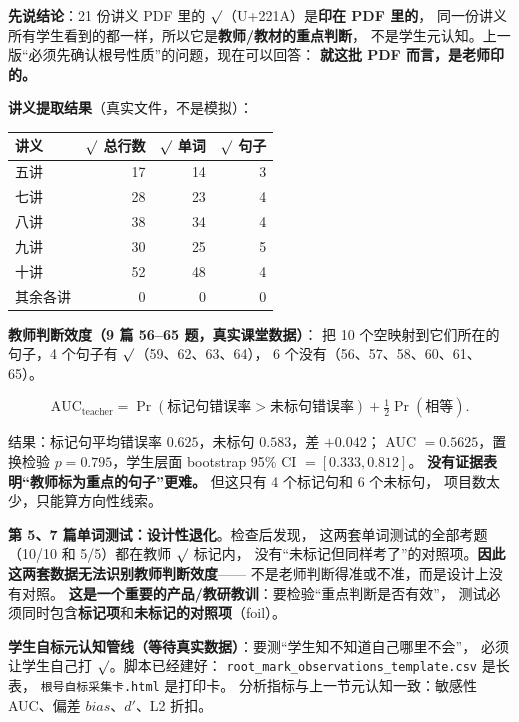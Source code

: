 \documentclass[UTF8,a4paper,11pt]{ctexart}
\begin{document}
\textbf{先说结论}：21 份讲义 PDF 里的 $\surd$（U+221A）是\textbf{印在 PDF 里的}，
同一份讲义所有学生看到的都一样，所以它是\textbf{教师/教材的重点判断}，
不是学生元认知。上一版“必须先确认根号性质”的问题，现在可以回答：
\textbf{就这批 PDF 而言，是老师印的。}

\textbf{讲义提取结果}（真实文件，不是模拟）：

\begin{center}
\begin{longtable}{@{}lrrr@{}}
\toprule
\textbf{讲义} & \textbf{$\surd$ 总行数} & \textbf{$\surd$ 单词} & \textbf{$\surd$ 句子} \\
\midrule
五讲 & 17 & 14 & 3 \\
七讲 & 28 & 23 & 4 \\
八讲 & 38 & 34 & 4 \\
九讲 & 30 & 25 & 5 \\
十讲 & 52 & 48 & 4 \\
其余各讲 & 0 & 0 & 0 \\
\bottomrule
\end{longtable}
\end{center}

\textbf{教师判断效度（9 篇 56--65 题，真实课堂数据）}：
把 10 个空映射到它们所在的句子，4 个句子有 $\surd$（59、62、63、64），
6 个没有（56、57、58、60、61、65）。

\begin{equation}
\text{AUC}_{\text{teacher}}=\Pr(\text{标记句错误率}>\text{未标句错误率})+\tfrac12\Pr(\text{相等}).
\end{equation}

结果：标记句平均错误率 $0.625$，未标句 $0.583$，差 $+0.042$；
AUC $=0.5625$，置换检验 $p=0.795$，学生层面 bootstrap 95\% CI $=[0.333,0.812]$。
\textbf{没有证据表明“教师标为重点的句子”更难。} 但这只有 4 个标记句和 6 个未标句，
项目数太少，只能算方向性线索。

\textbf{第 5、7 篇单词测试：设计性退化}。检查后发现，
这两套单词测试的全部考题（10/10 和 5/5）都在教师 $\surd$ 标记内，
没有“未标记但同样考了”的对照项。\textbf{因此这两套数据无法识别教师判断效度}——
不是老师判断得准或不准，而是设计上没有对照。
\textbf{这是一个重要的产品/教研教训}：要检验“重点判断是否有效”，
测试必须同时包含\textbf{标记项}和\textbf{未标记的对照项}（foil）。

\textbf{学生自标元认知管线（等待真实数据）}：要测“学生知不知道自己哪里不会”，
必须让学生自己打 $\surd$。脚本已经建好：
\texttt{root\_mark\_observations\_template.csv} 是长表，
\texttt{根号自标采集卡.html} 是打印卡。
分析指标与上一节元认知一致：敏感性 AUC、偏差 $bias$、$d'$、L2 折扣。
\end{document}
